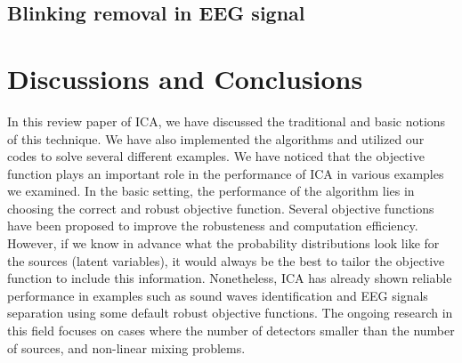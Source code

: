 \documentclass[aps,prl,preprint,superscriptaddress]{revtex4-2}
\begin{document}
\subsection{Blinking removal in EEG signal}








\section{Discussions and Conclusions}
In this review paper of ICA, we have discussed the traditional and basic notions of this technique. We have also implemented the algorithms and utilized our codes to solve several different examples. We have noticed that the objective function plays an important role in the performance of ICA in various examples we examined. In the basic setting, the performance of the algorithm lies in choosing the correct and robust objective function. Several objective functions have been proposed to improve the robusteness and computation efficiency. However, if we know in advance what the probability distributions look like for the sources (latent variables), it would always be the best to tailor the objective function to include this information. Nonetheless, ICA has already shown reliable performance in examples such as sound waves identification and EEG signals separation using some default robust objective functions. The ongoing research in this field focuses on cases where the number of detectors smaller than the number of sources, and non-linear mixing problems. 

{}
\end{document}
